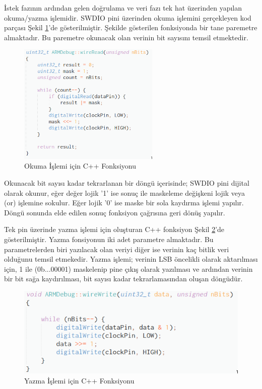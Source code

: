 İstek fazının ardından gelen doğrulama ve veri fazı tek hat üzerinden yapılan okuma/yazma işlemidir. SWDIO pini üzerinden okuma işlemini gerçekleyen kod parçası Şekil \ref{fig:wireRead}'de gösterilmiştir. Şekilde gösterilen fonksiyonda bir tane paremetre almaktadır. Bu paremetre okunacak olan verinin bit sayısını temsil etmektedir.
\clearpage
\begin{figure}
\centering
\includegraphics[width=0.6\textwidth]{gorseller/wireRead}
\caption{Okuma İşlemi için C++ Fonksiyonu}\label{fig:wireRead}
\end{figure}

Okunacak bit sayısı kadar tekrarlanan bir döngü içerisinde; SWDIO pini dijital olarak okunur, eğer değer lojik '1' ise sonuç ile maskeleme değişkeni lojik veya (or) işlemine sokulur. Eğer lojik '0' ise maske bir sola kaydırma işlemi yapılır. Döngü sonunda elde edilen sonuç fonksiyon çağrısına geri dönüş yapılır.

Tek pin üzerinde yazma işlemi için oluşturan C++ fonksiyon Şekil \ref{fig:wireWrite}'de gösterilmiştir. Yazma fonsiyonun iki adet parametre almaktadır. Bu parametrelerden biri yazılacak olan veriyi diğer ise verinin kaç bitlik veri olduğunu temsil etmekedir. Yazma işlemi; verinin \acrfull{LSB} öncelikli olarak aktarılması için, 1 ile (0b...00001) maskelenip pine çıkış olarak yazılması ve ardından verinin bir bit sağa kaydırılması, bit sayısı kadar tekrarlamasından oluşan döngüdür.


\begin{figure}[h]
\centering
\includegraphics[width=\textwidth]{gorseller/wireWrite}
\caption{Yazma İşlemi için C++ Fonksiyonu}\label{fig:wireWrite}
\end{figure}

